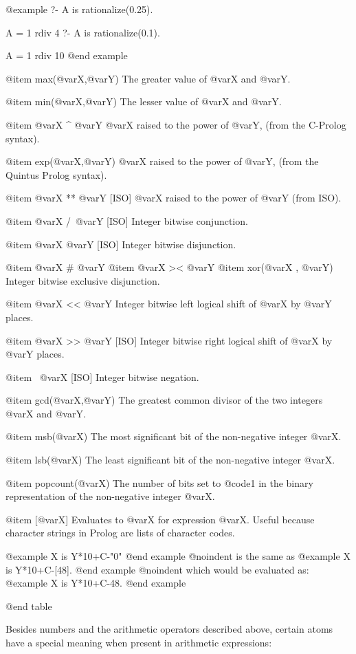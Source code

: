 {{{{@example
?- A is rationalize(0.25).

A = 1 rdiv 4
?- A is rationalize(0.1).

A = 1 rdiv 10
@end example


@item max(@var{X},@var{Y})
The greater value of @var{X} and @var{Y}.

@item min(@var{X},@var{Y})
The lesser value of @var{X} and @var{Y}.

@item @var{X} ^ @var{Y}
@var{X} raised to the power of @var{Y}, (from the C-Prolog syntax).

@item exp(@var{X},@var{Y})
@var{X} raised to the power of @var{Y}, (from the Quintus Prolog syntax).

@item @var{X} ** @var{Y} [ISO]
@var{X} raised to the power of @var{Y}  (from ISO).

@item @var{X} /\ @var{Y} [ISO]
Integer bitwise conjunction.

@item @var{X} \/ @var{Y} [ISO]
Integer bitwise disjunction.

@item @var{X} # @var{Y}
@item @var{X} >< @var{Y}
@item xor(@var{X} , @var{Y})
Integer bitwise exclusive disjunction.

@item @var{X} << @var{Y}
Integer bitwise left logical shift of @var{X} by @var{Y} places.

@item @var{X} >> @var{Y} [ISO]
Integer bitwise right logical shift of @var{X} by @var{Y} places.

@item \ @var{X} [ISO]
Integer bitwise negation.

@item gcd(@var{X},@var{Y})
The greatest common divisor of the two integers @var{X} and @var{Y}.

@item msb(@var{X})
The most significant bit of the non-negative integer @var{X}.

@item lsb(@var{X})
The least significant bit of the non-negative integer @var{X}.

@item popcount(@var{X})
The number of bits set to @code{1} in the binary representation of the
non-negative integer @var{X}.

@item [@var{X}]
Evaluates to @var{X} for expression @var{X}. Useful because character
strings in Prolog are lists of character codes.

@example
X is Y*10+C-"0"
@end example
@noindent
is the same as
@example
X is Y*10+C-[48].
@end example
@noindent
which would be evaluated as:
@example
X is Y*10+C-48.
@end example

@end table

Besides numbers and the arithmetic operators described above, certain
atoms have a special meaning when present in arithmetic expressions:

}}}}
